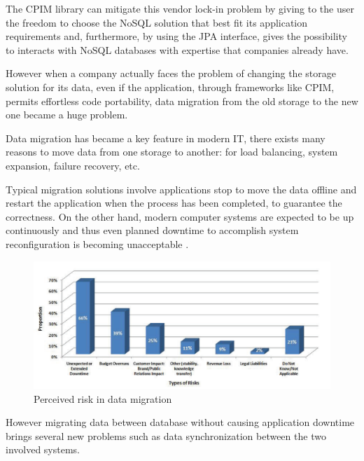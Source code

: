 \noindent The CPIM library can mitigate this vendor lock-in problem by giving to the user the freedom to choose the NoSQL solution that best fit its application requirements and, furthermore, by using the JPA interface, gives the possibility to interacts with NoSQL databases with expertise that companies already have.

\noindent However when a company actually faces the problem of changing the storage solution for its data, even if the application, through frameworks like CPIM, permits effortless code portability, data migration from the old storage to the new one became a huge problem. 

\newparagraph Data migration has became a key feature in modern IT, there exists many reasons to move data from one storage to another: for load balancing, system expansion, failure recovery, etc.

\noindent Typical migration solutions involve applications stop to move the data offline and restart the application when the process has been completed, to guarantee the correctness. On the other hand, modern computer systems are expected to be up continuously and thus even planned downtime to accomplish system reconfiguration is becoming unacceptable \cite{paper:hitachi}.

\begin{figure}[tbh]
  \centering
  \includegraphics[width=13cm]{images/hitachi_survey}
  \caption{Perceived risk in data migration \cite{paper:hitachi} }
  \label{fig:cpim-nosql}
\end{figure}

\noindent However migrating data between database without causing application downtime brings several new problems such as data synchronization between the two involved systems.

